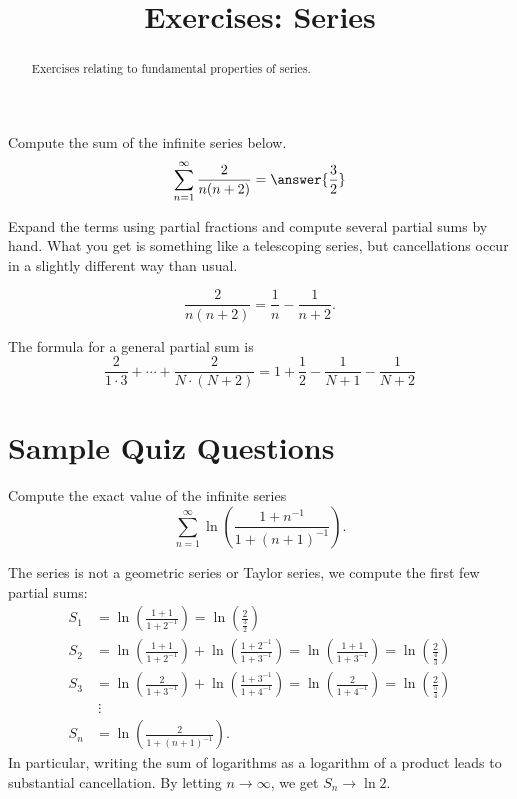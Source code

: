 \documentclass{ximera}
\title{Exercises: Series}
\begin{document}
\begin{abstract}
Exercises relating to fundamental properties of series.
\end{abstract}
\maketitle

\begin{exercise}
Compute the sum of the infinite series below.
\[ \sum_{n=1}^\infty \frac{2}{n(n+2)} = \answer{\frac{3}{2}} \]
\begin{hint}
Expand the terms using partial fractions and compute several partial sums by hand. What you get is something like a telescoping series, but cancellations occur in a slightly different way than usual.
\begin{hint}
\[ \frac{2}{n(n+2)} = \frac{1}{n} - \frac{1}{n+2}. \]
\begin{hint}
The formula for a general partial sum is
\[ \frac{2}{1 \cdot 3} + \cdots + \frac{2}{N \cdot (N+2)} = 1 + \frac{1}{2} - \frac{1}{N+1} - \frac{1}{N+2} \]
\end{hint}
\end{hint}
\end{hint}
\end{exercise}

\section*{Sample Quiz Questions}

\begin{question}%

Compute the exact value of the infinite series
\[ \sum_{n=1}^\infty \ln \left( \frac{1 + n^{-1}}{1 + (n+1)^{-1}} \right). \]
\begin{multiplechoice}
\end{multiplechoice}
\begin{feedback}
The series is not a geometric series or Taylor series, we compute the first few partial sums:
\[ 
\begin{aligned}
S_1 & = \ln \left( \frac{1 + 1}{1 + 2^{-1}} \right)  = \ln \left( \frac{2}{\frac{3}{2}} \right) \\
S_2 & = \ln \left( \frac{1 + 1}{1 + 2^{-1}} \right)  + \ln \left( \frac{1 + 2^{-1}}{1 + 3^{-1}} \right)  = \ln \left( \frac{1 + 1}{1 + 3^{-1}} \right) = \ln \left( \frac{2}{\frac{4}{3}} \right) \\
S_3 & = \ln \left( \frac{2}{1 + 3^{-1}} \right)  + \ln \left( \frac{1 + 3^{-1}}{1 + 4^{-1}} \right)  = \ln \left( \frac{2}{1 + 4^{-1}} \right) = \ln \left( \frac{2}{\frac{5}{4}} \right) \\
& \ \vdots  \\
S_n & = \ln \left( \frac{2}{1 + (n+1)^{-1}} \right).
 \end{aligned}
\]
In particular, writing the sum of logarithms as a logarithm of a product leads to substantial cancellation.  By letting \(n \rightarrow \infty\), we get \(S_n \rightarrow \ln 2\).
\end{feedback}

\end{question}
\end{document}
